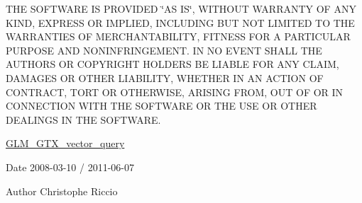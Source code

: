 T\+H\+E S\+O\+F\+T\+W\+A\+R\+E I\+S P\+R\+O\+V\+I\+D\+E\+D \char`\"{}\+A\+S I\+S\char`\"{}, W\+I\+T\+H\+O\+U\+T W\+A\+R\+R\+A\+N\+T\+Y O\+F A\+N\+Y K\+I\+N\+D, E\+X\+P\+R\+E\+S\+S O\+R I\+M\+P\+L\+I\+E\+D, I\+N\+C\+L\+U\+D\+I\+N\+G B\+U\+T N\+O\+T L\+I\+M\+I\+T\+E\+D T\+O T\+H\+E W\+A\+R\+R\+A\+N\+T\+I\+E\+S O\+F M\+E\+R\+C\+H\+A\+N\+T\+A\+B\+I\+L\+I\+T\+Y, F\+I\+T\+N\+E\+S\+S F\+O\+R A P\+A\+R\+T\+I\+C\+U\+L\+A\+R P\+U\+R\+P\+O\+S\+E A\+N\+D N\+O\+N\+I\+N\+F\+R\+I\+N\+G\+E\+M\+E\+N\+T. I\+N N\+O E\+V\+E\+N\+T S\+H\+A\+L\+L T\+H\+E A\+U\+T\+H\+O\+R\+S O\+R C\+O\+P\+Y\+R\+I\+G\+H\+T H\+O\+L\+D\+E\+R\+S B\+E L\+I\+A\+B\+L\+E F\+O\+R A\+N\+Y C\+L\+A\+I\+M, D\+A\+M\+A\+G\+E\+S O\+R O\+T\+H\+E\+R L\+I\+A\+B\+I\+L\+I\+T\+Y, W\+H\+E\+T\+H\+E\+R I\+N A\+N A\+C\+T\+I\+O\+N O\+F C\+O\+N\+T\+R\+A\+C\+T, T\+O\+R\+T O\+R O\+T\+H\+E\+R\+W\+I\+S\+E, A\+R\+I\+S\+I\+N\+G F\+R\+O\+M, O\+U\+T O\+F O\+R I\+N C\+O\+N\+N\+E\+C\+T\+I\+O\+N W\+I\+T\+H T\+H\+E S\+O\+F\+T\+W\+A\+R\+E O\+R T\+H\+E U\+S\+E O\+R O\+T\+H\+E\+R D\+E\+A\+L\+I\+N\+G\+S I\+N T\+H\+E S\+O\+F\+T\+W\+A\+R\+E.

\hyperlink{group__gtx__vector__query}{G\+L\+M\+\_\+\+G\+T\+X\+\_\+vector\+\_\+query}

\begin{DoxyDate}{Date}
2008-\/03-\/10 / 2011-\/06-\/07 
\end{DoxyDate}
\begin{DoxyAuthor}{Author}
Christophe Riccio 
\end{DoxyAuthor}
